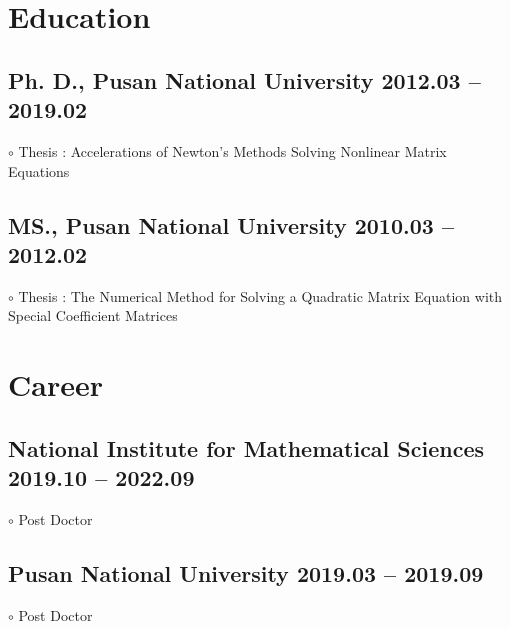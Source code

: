 \documentclass[11pt]{article} %
\begin{document}
\section*{Education}

\subsection*{Ph. D., Pusan National University \hfill 2012.03 -- 2019.02} %
$\circ$ Thesis : Accelerations of Newton's Methods Solving Nonlinear Matrix Equations

\subsection*{MS., Pusan National University \hfill 2010.03 -- 2012.02} %
$\circ$ Thesis : The Numerical Method for Solving a Quadratic Matrix Equation with Special Coefficient Matrices


%


\section*{Career}
\subsection*{National Institute for Mathematical Sciences \hfill 2019.10 -- 2022.09}
$\circ$ Post Doctor
\subsection*{Pusan National University \hfill 2019.03 -- 2019.09}
$\circ$ Post Doctor
\end{document}
